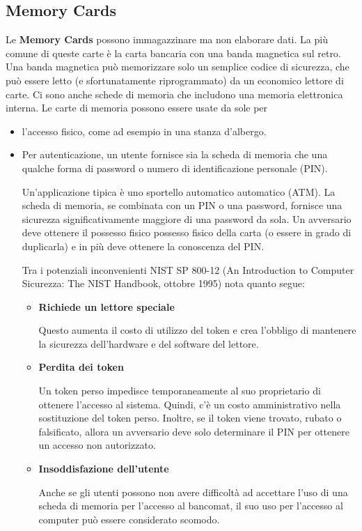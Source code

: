 \subsection{Memory Cards}
Le \textbf{Memory Cards} possono immagazzinare ma non elaborare dati.
\singlespacing
La più comune di queste carte è la carta bancaria con una banda magnetica sul retro. Una banda magnetica può memorizzare solo un semplice codice di sicurezza, che può essere letto (e sfortunatamente riprogrammato) da un economico lettore di carte. Ci sono anche schede di memoria che includono una memoria elettronica interna. Le carte di memoria possono essere usate da sole per
\begin{itemize}
    \item l'accesso fisico, come ad esempio in una stanza d'albergo.
    
    \item Per autenticazione, un utente fornisce sia la scheda di memoria che una qualche forma di password o numero di identificazione personale (PIN).
    
    Un'applicazione tipica è uno sportello automatico automatico (ATM). La scheda di memoria, se combinata con un PIN o una password, fornisce una sicurezza significativamente maggiore di una password da sola. Un avversario deve ottenere il possesso fisico possesso fisico della carta (o essere in grado di duplicarla) e in più deve ottenere la conoscenza del PIN. 
    
    \singlespacing
    
    Tra i potenziali inconvenienti NIST SP 800-12 (An Introduction to Computer Sicurezza: The NIST Handbook, ottobre 1995) nota quanto segue:
    
    \begin{itemize}
        \item \textbf{Richiede un lettore speciale}
        
        Questo aumenta il costo di utilizzo del token e crea l'obbligo di mantenere la sicurezza dell'hardware e del software del lettore.
        
        \item \textbf{Perdita dei token} 
        
        Un token perso impedisce temporaneamente al suo proprietario di ottenere l'accesso al sistema. Quindi, c'è un costo amministrativo nella sostituzione del token perso. Inoltre, se il token viene trovato, rubato o falsificato, allora un avversario deve solo determinare il PIN per ottenere un accesso non autorizzato.
        
        \item \textbf{Insoddisfazione dell'utente}
        
        Anche se gli utenti possono non avere difficoltà ad accettare l'uso di una scheda di memoria per l'accesso al bancomat, il suo uso per l'accesso al computer può essere considerato scomodo.
        
    \end{itemize}
\end{itemize}

